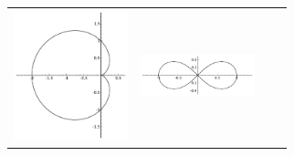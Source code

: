 {{{{{{{\newcommand{\mywidth}{1.3in}
\begin{center}
\begin{tabular}{cccc}


\includegraphics[width=\mywidth]{01-Curves-Coordinates-Differentials/cardioid}&
\includegraphics[width=\mywidth]{01-Curves-Coordinates-Differentials/lemniscate}&

\end{tabular}
\end{center}}}}}}}}
